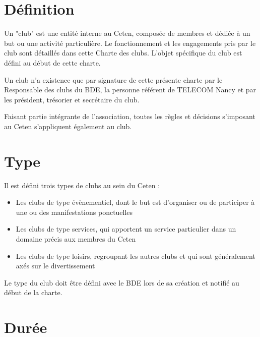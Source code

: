 \documentclass{article} %
\begin{document}
	\begin{multicols}{2}
		
		\section{Définition}
			
		{\small
			
			Un "club" est une entité interne au Ceten, composée de membres et
			dédiée à un but ou une activité particulière. Le fonctionnement et
			les engagements pris par le club sont détaillés dans cette Charte
			des clubs. L’objet spécifique du club est défini au début de cette
			charte.

			Un club n’a existence que par signature de cette présente charte par
			le Responsable des clubs du BDE, la personne référent de TELECOM
			Nancy et par les président, trésorier et secrétaire du club.

			Faisant partie intégrante de l’association, toutes les règles et
			décisions s’imposant au Ceten s’appliquent également au club.
			
			}

		\section{Type}
			
		{\small
		
			Il est défini trois types de clubs au sein du Ceten :
			\begin{itemize}
				\item Les clubs de type évènementiel, dont le but est
					d’organiser ou de participer à une ou des manifestations
					ponctuelles
				\item Les clubs de type services, qui apportent un service
					particulier dans un domaine précis aux membres du Ceten
				\item Les clubs de type loisirs, regroupant les autres clubs et
					qui sont généralement axés sur le divertissement
			\end{itemize}
			Le type du club doit être défini avec le BDE lors de sa création et
			notifié au début de la charte.
			
		}
		
		\section{Durée}
		
		{\small
			
}
\end{multicols}
\end{document}
